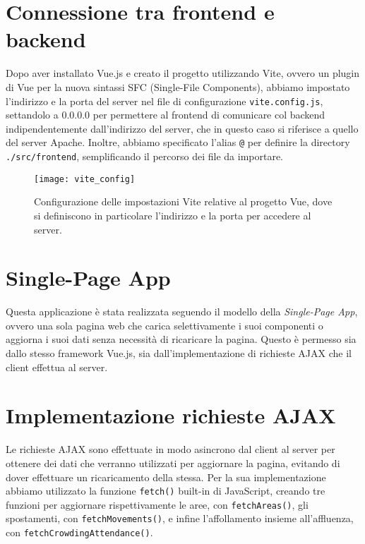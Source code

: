 \section{Connessione tra frontend e backend}
Dopo aver installato Vue.js e creato il progetto utilizzando Vite, ovvero un plugin di Vue per la nuova sintassi SFC (Single-File Components), abbiamo impostato l'indirizzo e la porta del server nel file di configurazione \Verb_vite.config.js_, settandolo a 0.0.0.0 per permettere al frontend di comunicare col backend indipendentemente dall'indirizzo del server, che in questo caso si riferisce a quello del server Apache. Inoltre, abbiamo specificato l'alias \Verb_@_ per definire la directory \Verb_./src/frontend_, semplificando il percorso dei file da importare.

\begin{figure}[H]
    \centering
    \texttt{[image: vite\_config]}
    \caption[Configurazione delle impostazioni Vite]{Configurazione delle impostazioni Vite relative al progetto Vue, dove si definiscono in particolare l'indirizzo e la porta per accedere al server.}
    \label{fig:vite_config}
\end{figure}

\section{Single-Page App}
Questa applicazione è stata realizzata seguendo il modello della \textit{Single-Page App}, ovvero una sola pagina web che carica selettivamente i suoi componenti o aggiorna i suoi dati senza necessità di ricaricare la pagina. Questo è permesso sia dallo stesso framework Vue.js, sia dall'implementazione di richieste AJAX che il client effettua al server.

\section{Implementazione richieste AJAX}
Le richieste AJAX sono effettuate in modo asincrono dal client al server per ottenere dei dati che verranno utilizzati per aggiornare la pagina, evitando di dover effettuare un ricaricamento della stessa. Per la sua implementazione abbiamo utilizzato la funzione \Verb_fetch()_ built-in di JavaScript, creando tre funzioni per aggiornare rispettivamente le aree, con \Verb_fetchAreas()_, gli spostamenti, con \Verb_fetchMovements()_, e infine l'affollamento insieme all'affluenza, con \Verb_fetchCrowdingAttendance()_. 

